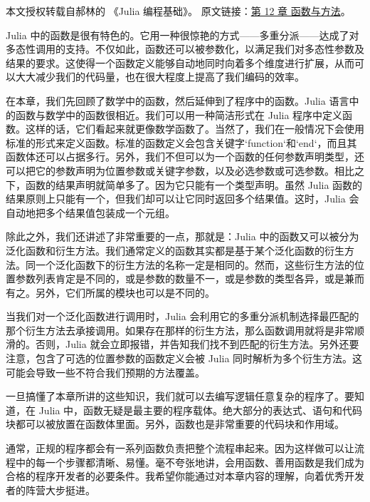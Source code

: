
本文授权转载自郝林的 《Julia 编程基础》。 原文链接：\href{https://github.com/hyper0x/JuliaBasics/blob/master/book/ch12.md}{第 12 章 函数与方法}。


Julia 中的函数是很有特色的。它用一种很惊艳的方式——多重分派——达成了对多态性调用的支持。不仅如此，函数还可以被参数化，以满足我们对多态性参数及结果的要求。这使得一个函数定义能够自动地同时向着多个维度进行扩展，从而可以大大减少我们的代码量，也在很大程度上提高了我们编码的效率。

在本章，我们先回顾了数学中的函数，然后延伸到了程序中的函数。Julia 语言中的函数与数学中的函数很相近。我们可以用一种简洁形式在 Julia 程序中定义函数。这样的话，它们看起来就更像数学函数了。当然了，我们在一般情况下会使用标准的形式来定义函数。标准的函数定义会包含关键字`function`和`end`，而且其函数体还可以占据多行。另外，我们不但可以为一个函数的任何参数声明类型，还可以把它的参数声明为位置参数或关键字参数，以及必选参数或可选参数。相比之下，函数的结果声明就简单多了。因为它只能有一个类型声明。虽然 Julia 函数的结果原则上只能有一个，但我们却可以让它同时返回多个结果值。这时，Julia 会自动地把多个结果值包装成一个元组。

除此之外，我们还讲述了非常重要的一点，那就是：Julia 中的函数又可以被分为泛化函数和衍生方法。我们通常定义的函数其实都是基于某个泛化函数的衍生方法。同一个泛化函数下的衍生方法的名称一定是相同的。然而，这些衍生方法的位置参数列表肯定是不同的，或是参数的数量不一，或是参数的类型各异，或是兼而有之。另外，它们所属的模块也可以是不同的。

当我们对一个泛化函数进行调用时，Julia 会利用它的多重分派机制选择最匹配的那个衍生方法去承接调用。如果存在那样的衍生方法，那么函数调用就将是非常顺滑的。否则，Julia 就会立即报错，并告知我们找不到匹配的衍生方法。另外还要注意，包含了可选的位置参数的函数定义会被 Julia 同时解析为多个衍生方法。这可能会导致一些不符合我们预期的方法覆盖。

一旦搞懂了本章所讲的这些知识，我们就可以去编写逻辑任意复杂的程序了。要知道，在 Julia 中，函数无疑是最主要的程序载体。绝大部分的表达式、语句和代码块都可以被放置在函数体里面。另外，函数也是非常重要的代码块和作用域。

通常，正规的程序都会有一系列函数负责把整个流程串起来。因为这样做可以让流程中的每一个步骤都清晰、易懂。毫不夸张地讲，会用函数、善用函数是我们成为合格的程序开发者的必要条件。我希望你能通过对本章内容的理解，向着优秀开发者的阵营大步挺进。